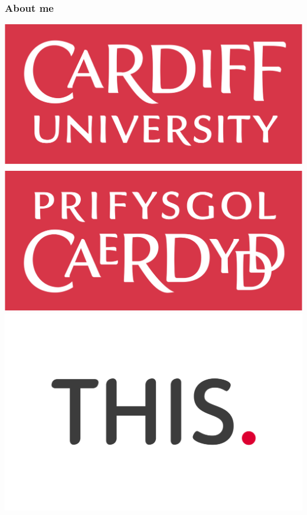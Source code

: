 \begin{frame}
    \frametitle{About me}
    \centering

    \includegraphics[scale=0.07]{Bin/CardiffUniLogo.png}
    \includegraphics[scale=0.14]{Bin/THISLogo.png}

\end{frame}
